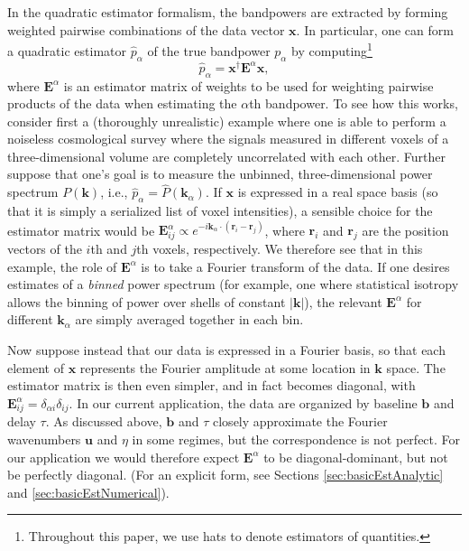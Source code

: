 \documentclass[twocolumn,aps,prd,nofootinbib,showpacs]{revtex4-1}
\begin{document}
In the quadratic estimator formalism, the bandpowers are extracted by forming weighted pairwise combinations of the data vector $\mathbf{x}$.  In particular, one can form a quadratic estimator $\hat{p}_\alpha$ of the true bandpower $p_\alpha$ by computing\footnote{Throughout this paper, we use hats to denote estimators of quantities.}
\begin{equation}
\label{eq:GenQuadEst}
\widehat{p}_\alpha = \mathbf{x}^\dagger \mathbf{E}^\alpha \mathbf{x},
\end{equation}
where $\mathbf{E}^\alpha$ is an estimator matrix of weights to be used for weighting pairwise products of the data when estimating the $\alpha$th bandpower.  To see how this works, consider first a (thoroughly unrealistic) example where one is able to perform a noiseless cosmological survey where the signals measured in different voxels of a three-dimensional volume are completely uncorrelated with each other.  Further suppose that one's goal is to measure the unbinned, three-dimensional power spectrum $P(\mathbf{k})$, i.e., $\widehat{p}_\alpha = \widehat{P}(\mathbf{k}_\alpha)$.  If $\mathbf{x}$ is expressed in a real space basis (so that it is simply a serialized list of voxel intensities), a sensible choice for the estimator matrix would be $\mathbf{E}^\alpha_{ij} \propto e^{-i \mathbf{k}_\alpha \cdot (\mathbf{r}_i - \mathbf{r}_j)}$, where $\mathbf{r}_i$ and $\mathbf{r}_j$ are the position vectors of the $i$th and $j$th voxels, respectively.  We therefore see that in this example, the role of $\mathbf{E}^\alpha$ is to take a Fourier transform of the data.  If one desires estimates of a \emph{binned} power spectrum (for example, one where statistical isotropy allows the binning of power over shells of constant $|\mathbf{k}|$), the relevant $\mathbf{E}^\alpha$ for different $\mathbf{k}_\alpha$ are simply averaged together in each bin.

Now suppose instead that our data is expressed in a Fourier basis, so that each element of $\mathbf{x}$ represents the Fourier amplitude at some location in $\mathbf{k}$ space.  The estimator matrix is then even simpler, and in fact becomes diagonal, with $\mathbf{E}^\alpha_{ij} = \delta_{\alpha i} \delta_{ij}$.  In our current application, the data are organized by baseline $\mathbf{b}$ and delay $\tau$.  As discussed above, $\mathbf{b}$ and $\tau$ closely approximate the Fourier wavenumbers $\mathbf{u}$ and $\eta$ in some regimes, but the correspondence is not perfect.  For our application we would therefore expect $\mathbf{E}^\alpha$ to be diagonal-dominant, but not be perfectly diagonal.  (For an explicit form, see Sections \ref{sec:basicEstAnalytic} and \ref{sec:basicEstNumerical}).
\end{document}
